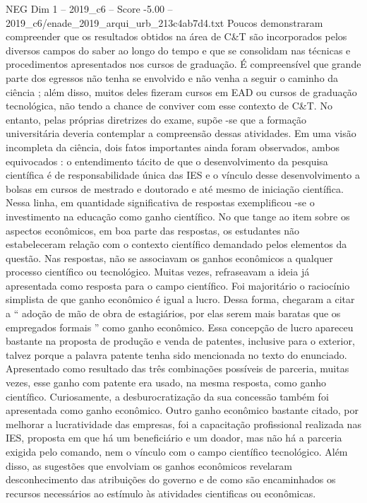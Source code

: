 \begin{textsample}{NEG Dim 1 – 2019\_c6 – Score -5.00 – 2019\_c6/enade\_2019\_arqui\_urb\_213c4ab7d4.txt}
Poucos demonstraram compreender que os resultados obtidos na área de C\&T são incorporados pelos diversos campos do saber ao longo do tempo e que se consolidam nas técnicas e procedimentos apresentados nos cursos de graduação.
É compreensível que grande parte dos egressos não tenha se envolvido e não venha a seguir o caminho da ciência ; além disso, muitos deles fizeram cursos em EAD ou cursos de graduação tecnológica, não tendo a chance de conviver com esse contexto de C\&T.
No entanto, pelas próprias diretrizes do exame, supõe -se que a formação universitária deveria contemplar a compreensão dessas atividades.
Em uma visão incompleta da ciência, dois fatos importantes ainda foram observados, ambos equivocados : o entendimento tácito de que o desenvolvimento da pesquisa científica é de responsabilidade única das IES e o vínculo desse desenvolvimento a bolsas em cursos de mestrado e doutorado e até mesmo de iniciação científica.
Nessa linha, em quantidade significativa de respostas exemplificou -se o investimento na educação como ganho científico.
No que tange ao item sobre os aspectos econômicos, em boa parte das respostas, os estudantes não estabeleceram relação com o contexto científico demandado pelos elementos da questão.
Nas respostas, não se associavam os ganhos econômicos a qualquer processo científico ou tecnológico.
Muitas vezes, refraseavam a ideia já apresentada como resposta para o campo científico.
Foi majoritário o raciocínio simplista de que ganho econômico é igual a lucro.
Dessa forma, chegaram a citar a “ adoção de mão de obra de estagiários, por elas serem mais baratas que os empregados formais ” como ganho econômico.
Essa concepção de lucro apareceu bastante na proposta de produção e venda de patentes, inclusive para o exterior, talvez porque a palavra patente tenha sido mencionada no texto do enunciado.
Apresentado como resultado das três combinações possíveis de parceria, muitas vezes, esse ganho com patente era usado, na mesma resposta, como ganho científico.
Curiosamente, a desburocratização da sua concessão também foi apresentada como ganho econômico.
Outro ganho econômico bastante citado, por melhorar a lucratividade das empresas, foi a capacitação profissional realizada nas IES, proposta em que há um beneficiário e um doador, mas não há a parceria exigida pelo comando, nem o vínculo com o campo científico tecnológico.
Além disso, as sugestões que envolviam os ganhos econômicos revelaram desconhecimento das atribuições do governo e de como são encaminhados os recursos necessários ao estímulo às atividades cientificas ou econômicas.

\end{textsample}
